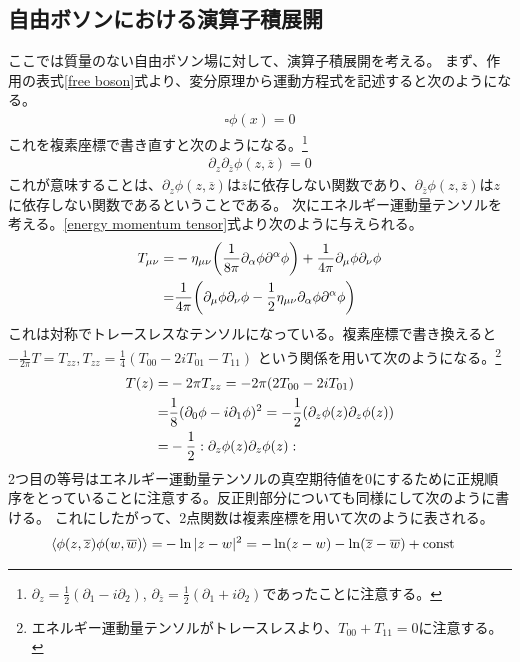 \documentclass[11pt, dvipdfmx]{article}
\numberwithin{equation}{section}
\begin{document}
\subsection{自由ボソンにおける演算子積展開}
ここでは質量のない自由ボソン場に対して、演算子積展開を考える。
まず、作用の表式\eqref{free boson}式より、変分原理から運動方程式を記述すると次のようになる。
\begin{align}
    \square \phi(x)=0
\end{align}
これを複素座標で書き直すと次のようになる。\footnote{
$\partial_z=\frac{1}{2}(\partial_1 - i \partial_2)$, $\partial_{\overline{z}}=\frac{1}{2}(\partial_1 + i \partial_2)$であったことに注意する。
}
\begin{align}
    \partial_z \partial_{\overline{z}}\phi(z,\overline{z})=0
\end{align}
これが意味することは、$\partial_z \phi(z,\overline{z})$は$\overline{z}$に依存しない関数であり、$\partial_{\overline{z}} \phi(z,\overline{z})$は$z$に依存しない関数であるということである。
次にエネルギー運動量テンソルを考える。\eqref{energy momentum tensor}式より次のように与えられる。
\begin{align}
    T_{\mu\nu}=&-\eta_{\mu\nu}\qty(\frac{1}{8\pi}\partial_{\alpha}\phi \partial^{\alpha}\phi) + \frac{1}{4\pi}\partial_{\mu}\phi \partial_{\nu}\phi\\
    =&\frac{1}{4\pi}\qty(\partial_{\mu}\phi \partial_{\nu}\phi - \frac{1}{2}\eta_{\mu\nu}\partial_{\alpha}\phi \partial^{\alpha}\phi)
\end{align}
これは対称でトレースレスなテンソルになっている。複素座標で書き換えると$-\frac{1}{2\pi}T=T_{zz}, T_{zz}=\frac{1}{4}(T_{00}-2iT_{01}-T_{11})$
という関係を用いて次のようになる。\footnote{
    エネルギー運動量テンソルがトレースレスより、$T_{00}+T_{11}=0$に注意する。
}
\begin{align}
    T(z)=&-2\pi T_{zz}=-2\pi(2T_{00}-2iT_{01})\\
    =&\frac{1}{8}(\partial_0\phi-i\partial_1\phi)^2=-\frac{1}{2}\qty(\partial_z \phi(z)\partial_z \phi(z))\\
=&- \frac{1}{2}:\partial_z \phi(z)\partial_z \phi(z):\label{boson energy momentum tensor}
\end{align}
2つ目の等号はエネルギー運動量テンソルの真空期待値を0にするために正規順序をとっていることに注意する。反正則部分についても同様にして次のように書ける。
これにしたがって、2点関数は複素座標を用いて次のように表される。
\begin{align}
    \ev{\phi(z,\overline{z})\phi(w,\overline{w})}=&- \ln |z-w|^2= - \ln (z-w) - \ln (\overline{z}-\overline{w})+\text{const}
\end{align}
\end{document}
